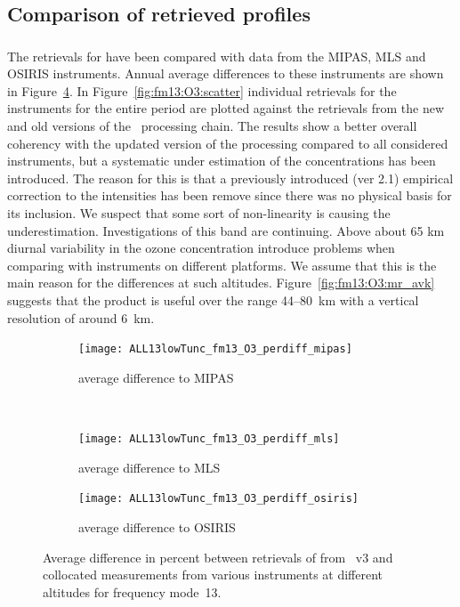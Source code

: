 \subsection{Comparison of retrieved profiles}
\label{sec:fm13:comparison}



\subsubsection{}
\label{sec:fm13:comparison:O3}
The retrievals for  have been compared with data from the MIPAS, MLS
and OSIRIS instruments. Annual average differences to these instruments are
shown in Figure~\ref{fig:fm13:O3:profiles}. In Figure~\ref{fig:fm13:O3:scatter}
individual retrievals for the instruments for the entire period are plotted
against the retrievals from the new and old versions of the \smr\ processing
chain. The results show a better overall coherency with the updated version of
the processing compared to all considered instruments, but a systematic under
estimation of the concentrations has been introduced. The reason for this is
that a previously introduced  (ver 2.1) empirical correction to the intensities
has been remove since there was no physical basis for its inclusion. We suspect
that some sort of non-linearity is causing the underestimation. Investigations
of this band are continuing.  Above about 65 km diurnal variability in the
ozone concentration introduce problems when comparing with instruments on
different platforms.   We assume that this is the main reason for the
differences at such altitudes.  Figure~\ref{fig:fm13:O3:mr_avk} suggests that
the product is useful over the range 44--80~km with a vertical resolution of
around 6~km.


\begin{figure}[tbhp]
    \centering
    \begin{subfigure}[b]{0.49\textwidth}
        \texttt{[image: ALL13lowTunc\_fm13\_O3\_perdiff\_mipas]}
        \caption{average difference to MIPAS}
        \label{fig:fm13:O3:profiles:MIPAS}
    \end{subfigure}
    \,
    \begin{subfigure}[b]{0.49\textwidth}
        \texttt{[image: ALL13lowTunc\_fm13\_O3\_perdiff\_mls]}
        \caption{average difference to MLS}
        \label{fig:fm13:O3:profiles:MLS}
    \end{subfigure}

    \begin{subfigure}[b]{0.49\textwidth}
        \texttt{[image: ALL13lowTunc\_fm13\_O3\_perdiff\_osiris]}
        \caption{average difference to OSIRIS}
        \label{fig:fm13:O3:profiles:OSIRIS}
    \end{subfigure}
    \caption{Average difference in percent between retrievals of 
    from \smr~v3 and collocated measurements from various instruments at
    different altitudes for frequency mode~13.}

    \label{fig:fm13:O3:profiles}
\end{figure}

